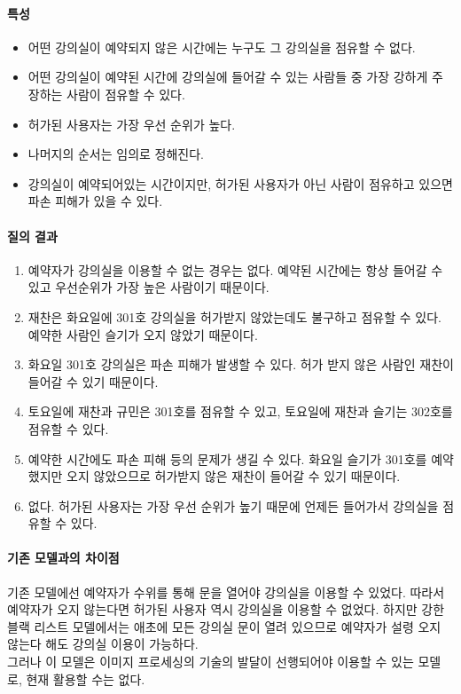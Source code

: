 \documentclass[11pt,a4paper]{article}
\begin{document}
\paragraph{특성}
\begin{itemize}
\item 어떤 강의실이 예약되지 않은 시간에는 누구도 그 강의실을 점유할 수 없다.
\item 어떤 강의실이 예약된 시간에 강의실에 들어갈 수 있는 사람들 중 가장 강하게 주장하는 사람이 점유할 수 있다.
\item 허가된 사용자는 가장 우선 순위가 높다.
\item 나머지의 순서는 임의로 정해진다.
\item 강의실이 예약되어있는 시간이지만, 허가된 사용자가 아닌 사람이 점유하고 있으면 파손 피해가 있을 수 있다.
\end{itemize}

\paragraph{질의 결과}
\begin{enumerate}
\item 예약자가 강의실을 이용할 수 없는 경우는 없다. 예약된 시간에는 항상 들어갈 수 있고 우선순위가 가장 높은 사람이기 때문이다.
\item 재찬은 화요일에 301호 강의실을 허가받지 않았는데도 불구하고 점유할 수 있다. 예약한 사람인 슬기가 오지 않았기 때문이다.
\item 화요일 301호 강의실은 파손 피해가 발생할 수 있다. 허가 받지 않은 사람인 재찬이 들어갈 수 있기 때문이다.
\item 토요일에 재찬과 규민은 301호를 점유할 수 있고, 토요일에 재찬과 슬기는 302호를 점유할 수 있다.
\item 예약한 시간에도 파손 피해 등의 문제가 생길 수 있다. 화요일 슬기가 301호를 예약했지만 오지 않았으므로 허가받지 않은 재찬이 들어갈 수 있기 때문이다.
\item 없다. 허가된 사용자는 가장 우선 순위가 높기 때문에 언제든 들어가서 강의실을 점유할 수 있다.
\end{enumerate}

\paragraph{기존 모델과의 차이점}
\hfill\break
기존 모델에선 예약자가 수위를 통해 문을 열어야 강의실을 이용할 수 있었다. 따라서 예약자가 오지 않는다면 허가된 사용자 역시 강의실을 이용할 수 없었다. 하지만 강한 블랙 리스트 모델에서는 애초에 모든 강의실 문이 열려 있으므로 예약자가 설령 오지 않는다 해도 강의실 이용이 가능하다.\\
그러나 이 모델은 이미지 프로세싱의 기술의 발달이 선행되어야 이용할 수 있는 모델로, 현재 활용할 수는 없다.
\end{document}
